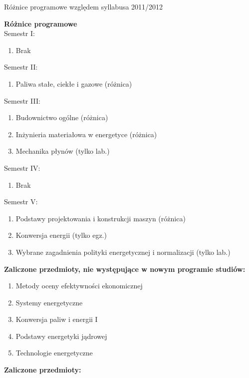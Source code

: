 \documentclass[a4paper,12pt]{article}
\begin{document}
\begin{center}
\Large{Różnice programowe względem syllabusa 2011/2012}
\end{center}
\vspace{20pt}
\textbf{Różnice programowe}\\
Semestr I:
\begin{enumerate}
\item Brak
\end{enumerate}
Semestr II:
\begin{enumerate}
\item Paliwa stałe, ciekłe i gazowe (różnica)
\end{enumerate}
Semestr III:
\begin{enumerate}
\item Budownictwo ogólne (różnica)
\item Inżynieria materiałowa w energetyce (różnica)
\item Mechanika płynów (tylko lab.)
\end{enumerate}
Semestr IV:
\begin{enumerate}
\item Brak
\end{enumerate}
Semestr V:
\begin{enumerate}
\item Podstawy projektowania i konstrukcji maszyn (różnica)
\item Konwersja energii (tylko egz.)
\item Wybrane zagadnienia polityki energetycznej i normalizacji (tylko lab.)
\end{enumerate}
\vspace{20pt}
\textbf{Zaliczone przedmioty, nie występujące w nowym programie studiów:}
\begin{enumerate}
\item Metody oceny efektywności ekonomicznej
\item Systemy energetyczne
\item Konwersja paliw i energii I
\item Podstawy energetyki jądrowej
\item Technologie energetyczne
\end{enumerate}
\newpage
\textbf{Zaliczone przedmioty:}
\end{document}
